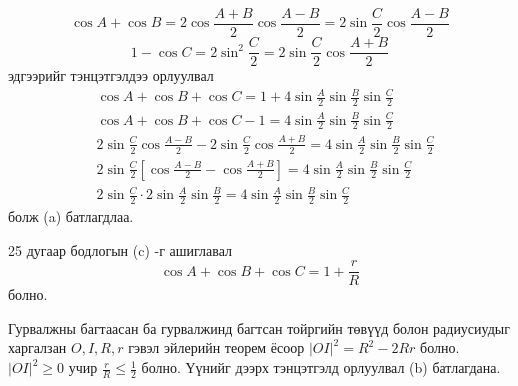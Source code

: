 \documentclass[10pt,a4paper,oneside]{book}
\begin{document}
\TheSolution
\begin{equation*}
\cos A + \cos B = 2\cos \frac{A+B}{2}\cos \frac{A-B}{2} = 2\sin \frac{C}{2}\cos \frac{A-B}{2}
\end{equation*}
\begin{equation*}
1-\cos C = 2\sin^2 \frac{C}{2} = 2\sin \frac{C}{2}\cos \frac{A+B}{2}
\end{equation*}
эдгээрийг тэнцэтгэлдээ орлуулвал
\begin{align*}
&\cos A + \cos B + \cos C = 1 + 4\sin \frac{A}{2}\sin \frac{B}{2}\sin \frac{C}{2}\\
&\cos A + \cos B + \cos C -1 = 4\sin \frac{A}{2}\sin \frac{B}{2}\sin \frac{C}{2}\\
&2\sin \frac{C}{2}\cos \frac{A-B}{2} - 2\sin \frac{C}{2}\cos \frac{A+B}{2} = 4\sin \frac{A}{2}\sin \frac{B}{2}\sin \frac{C}{2}\\
&2\sin \frac{C}{2} \left[\cos \frac{A-B}{2} - \cos \frac{A+B}{2}\right] = 4\sin \frac{A}{2}\sin \frac{B}{2}\sin \frac{C}{2}\\
&2\sin \frac{C}{2} \cdot 2\sin \frac{A}{2} \sin \frac{B}{2} = 4\sin \frac{A}{2}\sin \frac{B}{2}\sin \frac{C}{2}
\end{align*}
болж (a) батлагдлаа.

25 дугаар бодлогын (c) -г ашиглавал
\begin{equation*}
\cos A + \cos B + \cos C = 1+\frac{r}{R}
\end{equation*}
болно.

Гурвалжны багтаасан ба гурвалжинд багтсан тойргийн төвүүд болон радиусиудыг харгалзан $O, I, R, r$ гэвэл эйлерийн теорем ёсоор $|OI|^2 = R^2 - 2Rr$ болно. $|OI|^2 \geq 0$ учир $\frac{r}{R} \leq \frac{1}{2}$ болно. Үүнийг дээрх тэнцэтгэлд орлуулвал (b) батлагдана.
\end{document}
